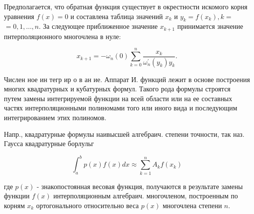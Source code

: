 \documentclass[10pt]{article}
\begin{document}
Предполагается, что обратная функция существует в окрестности искомого корня уравнения $f(x)=0$ и составлена таблица значений $x_{k}$ и $y_{k}=f\left(x_{k}\right), k=$ $=0,1, \ldots, n$. За следующее приближенное значение $x_{k+1}$ принимается значение пнтерполяционного многочлена в нуле:



\[

x_{k+1}=-\omega_{n}(0) \sum_{k=0}^{n} \frac{x_{k}}{\omega_{n}^{\prime}\left(y_{k}\right) y_{k}} .

\]



Числен ное ин тегр ир о в ан ие. Аппарат И. функций лежит в основе построения многих квадратурных и кубатурных формул. Такого рода формулы строятся путем замены интегрируемой функции на всей области или на ее составных частях интерполяционными полиномами того или иного вида и последующим интегрированием этих полиномов.



Напр., квадратурные формулы наивысшей алгебраич. степени точности, так наз. Гаусса квадратурные борлульг



\[

\int_{a}^{b} p(x) f(x) d x \approx \sum_{k=1}^{n} A_{k} f\left(x_{k}\right)

\]



где $p(x)$ - знакопостоянная весовая функция, получаются в результате замены функции $f(x)$ интерполяционным алгебраич. многочленом, построенным по корням $x_{k}$ ортогонального относительно веса $p(x)$ многочлена степени $n$.
\end{document}
